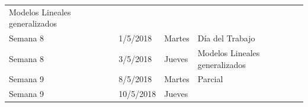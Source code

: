 \documentclass[]{book}
\theoremstyle{definition}
\theoremstyle{definition}
\theoremstyle{definition}
\theoremstyle{remark}
\begin{document}
\begin{longtable}[]{@{}llll@{}}
\begin{minipage}[t]{0.69\columnwidth}
Modelos Lineales generalizados\strut
\end{minipage}\tabularnewline
\begin{minipage}[t]{0.07\columnwidth}\raggedright
Semana 8\strut
\end{minipage} & \begin{minipage}[t]{0.07\columnwidth}\raggedright
1/5/2018\strut
\end{minipage} & \begin{minipage}[t]{0.05\columnwidth}\raggedright
Martes\strut
\end{minipage} & \begin{minipage}[t]{0.69\columnwidth}\raggedright
Día del Trabajo\strut
\end{minipage}\tabularnewline
\begin{minipage}[t]{0.07\columnwidth}\raggedright
Semana 8\strut
\end{minipage} & \begin{minipage}[t]{0.07\columnwidth}\raggedright
3/5/2018\strut
\end{minipage} & \begin{minipage}[t]{0.05\columnwidth}\raggedright
Jueves\strut
\end{minipage} & \begin{minipage}[t]{0.69\columnwidth}\raggedright
Modelos Lineales generalizados\strut
\end{minipage}\tabularnewline
\begin{minipage}[t]{0.07\columnwidth}\raggedright
Semana 9\strut
\end{minipage} & \begin{minipage}[t]{0.07\columnwidth}\raggedright
8/5/2018\strut
\end{minipage} & \begin{minipage}[t]{0.05\columnwidth}\raggedright
Martes\strut
\end{minipage} & \begin{minipage}[t]{0.69\columnwidth}\raggedright
Parcial\strut
\end{minipage}\tabularnewline
\begin{minipage}[t]{0.07\columnwidth}\raggedright
Semana 9\strut
\end{minipage} & \begin{minipage}[t]{0.07\columnwidth}\raggedright
10/5/2018\strut
\end{minipage} & \begin{minipage}[t]{0.05\columnwidth}\raggedright
Jueves\strut
\end{minipage} & \begin{minipage}[t]{0.69\columnwidth}\raggedright

\end{minipage}
\end{longtable}
\end{document}
